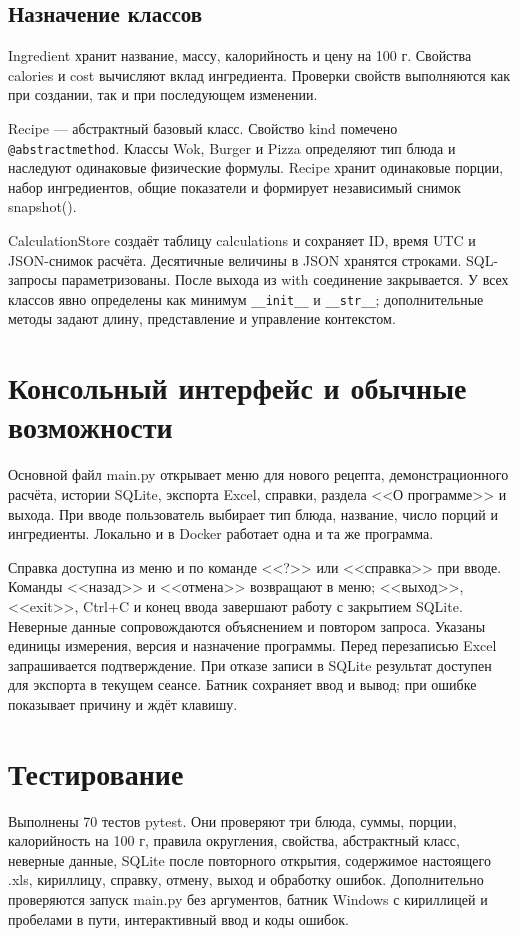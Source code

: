 \documentclass[12pt,a4paper]{article}
\begin{document}
\subsection{Назначение классов}
Ingredient хранит название, массу, калорийность и цену на 100 г.
Свойства calories и cost вычисляют вклад ингредиента.
Проверки свойств выполняются как при создании, так и при последующем изменении.

Recipe --- абстрактный базовый класс. Свойство kind помечено
\texttt{@abstractmethod}. Классы Wok, Burger и Pizza определяют тип блюда
и наследуют одинаковые физические формулы. Recipe хранит одинаковые порции,
набор ингредиентов, общие показатели и формирует независимый снимок snapshot().

CalculationStore создаёт таблицу calculations и сохраняет ID, время UTC и
JSON-снимок расчёта. Десятичные величины в JSON хранятся строками.
SQL-запросы параметризованы. После выхода из with соединение закрывается.
У всех классов явно определены как минимум \texttt{\_\_init\_\_} и
\texttt{\_\_str\_\_}; дополнительные методы задают длину, представление
и управление контекстом.

\section{Консольный интерфейс и обычные возможности}
Основной файл main.py открывает меню для нового рецепта, демонстрационного расчёта,
истории SQLite, экспорта Excel, справки, раздела <<О программе>> и выхода.
При вводе пользователь выбирает тип блюда, название, число порций и ингредиенты.
Локально и в Docker работает одна и та же программа.

Справка доступна из меню и по команде <<?>> или <<справка>> при вводе.
Команды <<назад>> и <<отмена>> возвращают в меню; <<выход>>, <<exit>>,
Ctrl+C и конец ввода завершают работу с закрытием SQLite.
Неверные данные сопровождаются объяснением и повтором запроса.
Указаны единицы измерения, версия и назначение программы.
Перед перезаписью Excel запрашивается подтверждение.
При отказе записи в SQLite результат доступен для экспорта в текущем сеансе.
Батник сохраняет ввод и вывод; при ошибке показывает причину и ждёт клавишу.

\section{Тестирование}
Выполнены 70 тестов pytest. Они проверяют три блюда, суммы, порции, калорийность на 100 г,
правила округления, свойства, абстрактный класс, неверные данные,
SQLite после повторного открытия, содержимое настоящего .xls,
кириллицу, справку, отмену, выход и обработку ошибок. Дополнительно проверяются запуск main.py без аргументов,
батник Windows с кириллицей и пробелами в пути, интерактивный ввод и коды ошибок.
\end{document}
